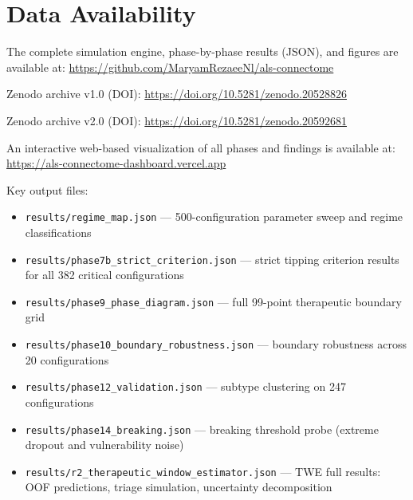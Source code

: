 \documentclass[12pt,a4paper]{article}
\begin{document}
\clearpage
\section*{Data Availability}

The complete simulation engine, phase-by-phase results (JSON), and figures are available at:
\url{https://github.com/MaryamRezaeeNl/als-connectome}

Zenodo archive v1.0 (DOI): \url{https://doi.org/10.5281/zenodo.20528826}

Zenodo archive v2.0 (DOI): \url{https://doi.org/10.5281/zenodo.20592681}

An interactive web-based visualization of all phases and findings is available at:
\url{https://als-connectome-dashboard.vercel.app}

Key output files:
\begin{itemize}
\item \texttt{results/regime\_map.json} --- 500-configuration parameter sweep and regime classifications
\item \texttt{results/phase7b\_strict\_criterion.json} --- strict tipping criterion results for all 382 critical configurations
\item \texttt{results/phase9\_phase\_diagram.json} --- full 99-point therapeutic boundary grid
\item \texttt{results/phase10\_boundary\_robustness.json} --- boundary robustness across 20 configurations
\item \texttt{results/phase12\_validation.json} --- subtype clustering on 247 configurations
\item \texttt{results/phase14\_breaking.json} --- breaking threshold probe (extreme dropout and vulnerability noise)
\item \texttt{results/r2\_therapeutic\_window\_estimator.json} --- TWE full results: OOF predictions, triage simulation, uncertainty decomposition
\end{itemize}



\end{document}
